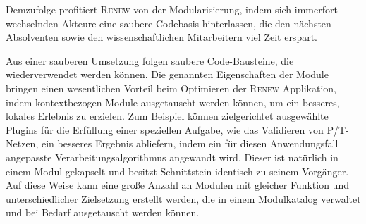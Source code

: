 		Demzufolge profitiert \textsc{Renew} von der Modularisierung, indem sich immerfort wechselnden Akteure eine saubere Codebasis hinterlassen, die den nächsten Absolventen sowie den wissenschaftlichen Mitarbeitern viel Zeit erspart. \bigbreak

		Aus einer sauberen Umsetzung folgen saubere Code-Bausteine, die wiederverwendet werden können. Die genannten Eigenschaften der Module bringen einen wesentlichen Vorteil beim Optimieren der \textsc{Renew} Applikation, indem kontextbezogen Module ausgetauscht werden können, um ein besseres, lokales Erlebnis zu erzielen. Zum Beispiel können zielgerichtet ausgewählte Plugins für die Erfüllung einer speziellen Aufgabe, wie das Validieren von P/T-Netzen, ein besseres Ergebnis abliefern, indem ein für diesen Anwendungsfall angepasste Verarbeitungsalgorithmus angewandt wird. Dieser ist natürlich in einem Modul gekapselt und besitzt Schnittstein identisch zu seinem Vorgänger. Auf diese Weise kann eine große Anzahl an Modulen mit gleicher Funktion und unterschiedlicher Zielsetzung erstellt werden, die in einem Modulkatalog verwaltet und bei Bedarf ausgetauscht werden können.

